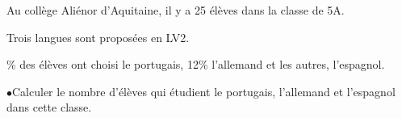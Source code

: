\documentclass[exercice]{thedocument}%
\begin{document}
%
Au collège Aliénor d'Aquitaine, il y a 25 élèves dans la classe de 5A.\par\noindent
Trois langues sont proposées en LV2.\par{}\% des élèves ont choisi le portugais, 12\% l'allemand et les autres, l'espagnol.\par\medskip
$\bullet$\quad Calculer le nombre d'élèves qui étudient le portugais, l'allemand et l'espagnol
dans cette classe.
\end{document}
